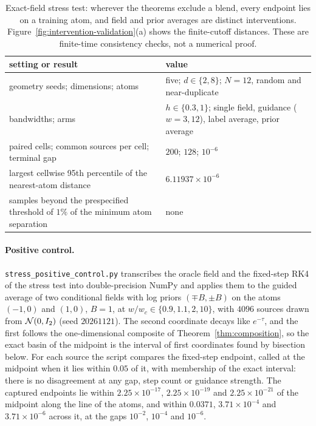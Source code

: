\documentclass{article} %
\theoremstyle{plain}
\theoremstyle{definition}
\theoremstyle{remark}
\begin{document}
\begin{table}[htb]
\centering\small
\begin{tabular}{@{}>{\raggedright\arraybackslash}p{}>{\raggedright\arraybackslash}p{}@{}}
\toprule
setting or result & value\\
\midrule
geometry seeds; dimensions; atoms & five; $d\in\{2,8\}$; $N=12$, random and near-duplicate\\
bandwidths; arms & $h\in\{0.3,1\}$; single field, guidance ($w=3,12$), label average, prior average\\
paired cells; common sources per cell; terminal gap & $200$; $128$; $10^{-6}$\\
\midrule
largest cellwise 95th percentile of the nearest-atom distance & $6.11937\times10^{-6}$\\
samples beyond the prespecified threshold of $1\%$ of the minimum atom separation & none\\
\bottomrule
\end{tabular}
\caption{Exact-field stress test: wherever the theorems exclude a blend, every endpoint lies on a
training atom, and field and prior averages are distinct interventions.
Figure~\ref{fig:intervention-validation}(a) shows the finite-cutoff distances. These are
finite-time consistency checks, not a numerical proof.}
\label{tab:stress}
\end{table}

\paragraph{Positive control.} \texttt{stress\_positive\_control.py} transcribes the oracle field and
the fixed-step RK4 of the stress test into double-precision NumPy and applies them to the guided
average of two conditional fields with log priors $(\mp B,\pm B)$ on the atoms $(-1,0)$ and
$(1,0)$, $B=1$, at $w/w_c\in\{0.9,1.1,2,10\}$, with $4096$ sources drawn from $\mathcal{N}(0,I_2)$ (seed
$20261121$). The second coordinate decays like $e^{-\tau}$, and the first follows the
one-dimensional composite of Theorem~\ref{thm:composition}, so the exact basin of the midpoint is
the interval of first coordinates found by bisection below. For each source the script compares the
fixed-step endpoint, called at the midpoint when it lies within $0.05$ of it, with membership of
the exact interval: there is no disagreement at any gap, step count or guidance strength. The
captured endpoints lie within $2.25\times10^{-17}$, $2.25\times10^{-19}$ and $2.25\times10^{-21}$ of
the midpoint along the line of the atoms, and within $0.0371$, $3.71\times10^{-4}$ and
$3.71\times10^{-6}$ across it, at the gaps $10^{-2}$, $10^{-4}$ and $10^{-6}$.
\end{document}
